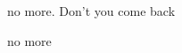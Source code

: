 \begin{song}
\bigskip

\Chorus

\bigskip

 \par
no more.  Don't you come back \par
no more    \par
{} \par

\end{song}
